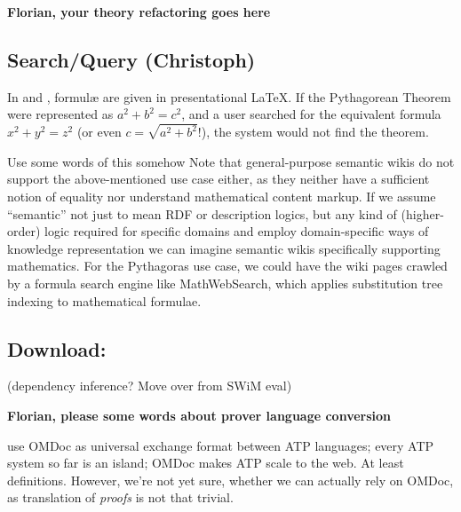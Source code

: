 
\textbf{Florian, your theory refactoring goes here}


\subsection{Search/Query (Christoph)}



  In  and , formulæ are given in
  presentational {\LaTeX}.  If the Pythagorean Theorem were represented as $a^2
  + b^2 = c^2$, and a user searched for the equivalent formula $x^2 + y^2 = z^2$
  (or even $c=\sqrt{a^2+b^2}$!), the system would not find the theorem.


\begin{oldpart}{Use some words of this somehow}
  Note that general-purpose semantic wikis do not support the above-mentioned
  use case either, as they neither have a sufficient notion of equality nor
  understand mathematical content markup.  If we assume ``semantic'' not just to
  mean RDF or description logics, but any kind of (higher-order) logic required
  for specific domains and employ domain-specific ways of
  knowledge representation we can imagine semantic wikis specifically supporting
  mathematics.  For the Pythagoras use case, we could have the wiki pages
  crawled by a formula search engine like MathWebSearch\cite{KohSuc:asemf06},
  which applies substitution tree indexing to mathematical formulae.
\end{oldpart}


\subsection{Download:}

(dependency inference? Move over from SWiM eval)


\textbf{Florian, please some words about prover language conversion}

use OMDoc as universal exchange format between ATP languages; every ATP system so far is
an island; OMDoc makes ATP scale to the web.  At least definitions.  However, we're not
yet sure, whether we can actually rely on OMDoc, as translation
of \emph{proofs} is not that trivial.

